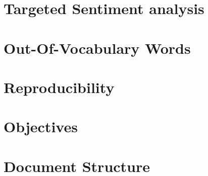\documentclass[../../fyp.tex]{subfiles}
\begin{document}


\section{Targeted Sentiment analysis} 

\section{Out-Of-Vocabulary Words} 

\section{Reproducibility} 

\section{Objectives} \label{sec:objectives}

\section{Document Structure}

\end{document}
